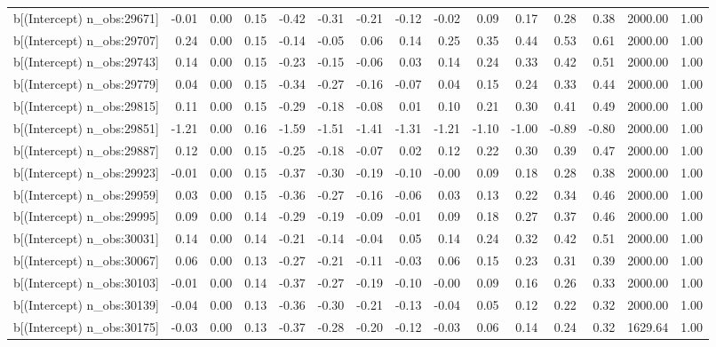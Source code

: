 \begin{table}[ht]
\begin{tabular}{rrrrrrrrrrrrrrr}
  b[(Intercept) n\_obs:29671] & -0.01 & 0.00 & 0.15 & -0.42 & -0.31 & -0.21 & -0.12 & -0.02 & 0.09 & 0.17 & 0.28 & 0.38 & 2000.00 & 1.00 \\ 
  b[(Intercept) n\_obs:29707] & 0.24 & 0.00 & 0.15 & -0.14 & -0.05 & 0.06 & 0.14 & 0.25 & 0.35 & 0.44 & 0.53 & 0.61 & 2000.00 & 1.00 \\ 
  b[(Intercept) n\_obs:29743] & 0.14 & 0.00 & 0.15 & -0.23 & -0.15 & -0.06 & 0.03 & 0.14 & 0.24 & 0.33 & 0.42 & 0.51 & 2000.00 & 1.00 \\ 
  b[(Intercept) n\_obs:29779] & 0.04 & 0.00 & 0.15 & -0.34 & -0.27 & -0.16 & -0.07 & 0.04 & 0.15 & 0.24 & 0.33 & 0.44 & 2000.00 & 1.00 \\ 
  b[(Intercept) n\_obs:29815] & 0.11 & 0.00 & 0.15 & -0.29 & -0.18 & -0.08 & 0.01 & 0.10 & 0.21 & 0.30 & 0.41 & 0.49 & 2000.00 & 1.00 \\ 
  b[(Intercept) n\_obs:29851] & -1.21 & 0.00 & 0.16 & -1.59 & -1.51 & -1.41 & -1.31 & -1.21 & -1.10 & -1.00 & -0.89 & -0.80 & 2000.00 & 1.00 \\ 
  b[(Intercept) n\_obs:29887] & 0.12 & 0.00 & 0.15 & -0.25 & -0.18 & -0.07 & 0.02 & 0.12 & 0.22 & 0.30 & 0.39 & 0.47 & 2000.00 & 1.00 \\ 
  b[(Intercept) n\_obs:29923] & -0.01 & 0.00 & 0.15 & -0.37 & -0.30 & -0.19 & -0.10 & -0.00 & 0.09 & 0.18 & 0.28 & 0.38 & 2000.00 & 1.00 \\ 
  b[(Intercept) n\_obs:29959] & 0.03 & 0.00 & 0.15 & -0.36 & -0.27 & -0.16 & -0.06 & 0.03 & 0.13 & 0.22 & 0.34 & 0.46 & 2000.00 & 1.00 \\ 
  b[(Intercept) n\_obs:29995] & 0.09 & 0.00 & 0.14 & -0.29 & -0.19 & -0.09 & -0.01 & 0.09 & 0.18 & 0.27 & 0.37 & 0.46 & 2000.00 & 1.00 \\ 
  b[(Intercept) n\_obs:30031] & 0.14 & 0.00 & 0.14 & -0.21 & -0.14 & -0.04 & 0.05 & 0.14 & 0.24 & 0.32 & 0.42 & 0.51 & 2000.00 & 1.00 \\ 
  b[(Intercept) n\_obs:30067] & 0.06 & 0.00 & 0.13 & -0.27 & -0.21 & -0.11 & -0.03 & 0.06 & 0.15 & 0.23 & 0.31 & 0.39 & 2000.00 & 1.00 \\ 
  b[(Intercept) n\_obs:30103] & -0.01 & 0.00 & 0.14 & -0.37 & -0.27 & -0.19 & -0.10 & -0.00 & 0.09 & 0.16 & 0.26 & 0.33 & 2000.00 & 1.00 \\ 
  b[(Intercept) n\_obs:30139] & -0.04 & 0.00 & 0.13 & -0.36 & -0.30 & -0.21 & -0.13 & -0.04 & 0.05 & 0.12 & 0.22 & 0.32 & 2000.00 & 1.00 \\ 
  b[(Intercept) n\_obs:30175] & -0.03 & 0.00 & 0.13 & -0.37 & -0.28 & -0.20 & -0.12 & -0.03 & 0.06 & 0.14 & 0.24 & 0.32 & 1629.64 & 1.00 \\ 

\end{tabular}
\end{table}

